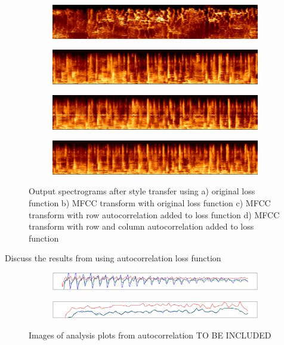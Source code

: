 \documentclass{article}
\begin{document}
\begin{figure}[h]
\begin{subfigure}{\textwidth}
  \centering
  \includegraphics[width = \textwidth]{out1_spec}
  \caption{}
\end{subfigure}
\begin{subfigure}{\textwidth}
  \centering
  \includegraphics[width = \textwidth]{out2_spec}
  \caption{}
\end{subfigure}
\begin{subfigure}{\textwidth}
  \centering
  \includegraphics[width = \textwidth]{out3_spec}
  \caption{}
\end{subfigure}
\begin{subfigure}{\textwidth}
  \centering
  \includegraphics[width = \textwidth]{out4_spec}
  \caption{}
\end{subfigure}
\caption{Output spectrograms after style transfer using a) original loss function b) MFCC transform with original loss function c) MFCC transform with row autocorrelation added to loss function d) MFCC transform with row and column autocorrelation added to loss function}
\end{figure}

Discuss the results from using autocorrelation loss function

\begin{figure}[h]
\begin{subfigure}{\textwidth}
  \centering
  \includegraphics[width = \textwidth]{row_ac_input}
  \caption{}
\end{subfigure}
\begin{subfigure}{\textwidth}
  \centering
  \includegraphics[width = \textwidth]{col_ac_input}
  \caption{}
\end{subfigure}
\caption{Images of analysis plots from autocorrelation TO BE INCLUDED}
\end{figure}
\end{document}
